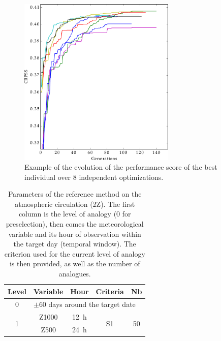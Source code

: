 \documentclass[review]{elsarticle}
\begin{document}
\begin{figure}[t]
	\centerline{\includegraphics[width=7.5cm]{figures/fig10.pdf}}
	\caption{Example of the evolution of the performance score of the best individual over 8 independent optimizations.}
	\label{fig:evolution}
\end{figure}

\clearpage


\begin{table}[t]
	\caption{Parameters of the reference method on the atmospheric circulation (2Z). The first column is the level of analogy (0 for preselection), then comes the meteorological variable and its hour of observation within the target day (temporal window). The criterion used for the current level of analogy is then provided, as well as the number of analogues.}
	\footnotesize
	\begin{center}
		\begin{tabular}{ccccc}
			\hline
			Level & Variable & Hour & Criteria & Nb \\ 
			\hline 
			0 & \multicolumn{4}{l}{$\pm 60$ days around the target date} \\
			\hline 
			\multirow{2}{*}{1} & Z1000 & 12~h & \multirow{2}{*}{S1} & \multirow{2}{*}{50} \\
			& Z500 & 24~h & & \\ 
			\hline 
		\end{tabular} 
	\end{center}
	\label{table:params_R1}
\end{table}
\end{document}
